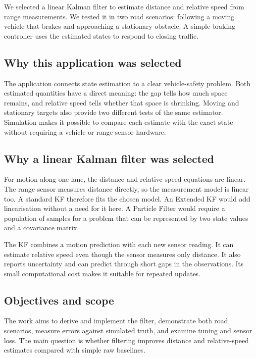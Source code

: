 \documentclass[11pt,a4paper]{article}
\begin{document}
We selected a linear Kalman filter to estimate distance and relative speed from range measurements. We tested it in two road scenarios: following a moving vehicle that brakes and approaching a stationary obstacle. A simple braking controller uses the estimated states to respond to closing traffic.\par

\subsection{Why this application was selected}
The application connects state estimation to a clear vehicle-safety problem. Both estimated quantities have a direct meaning: the gap tells how much space remains, and relative speed tells whether that space is shrinking. Moving and stationary targets also provide two different tests of the same estimator. Simulation makes it possible to compare each estimate with the exact state without requiring a vehicle or range-sensor hardware.\par

\subsection{Why a linear Kalman filter was selected}
For motion along one lane, the distance and relative-speed equations are linear. The range sensor measures distance directly, so the measurement model is linear too. A standard KF therefore fits the chosen model. An Extended KF would add linearisation without a need for it here. A Particle Filter would require a population of samples for a problem that can be represented by two state values and a covariance matrix.\par

The KF combines a motion prediction with each new sensor reading. It can estimate relative speed even though the sensor measures only distance. It also reports uncertainty and can predict through short gaps in the observations. Its small computational cost makes it suitable for repeated updates.\par

\subsection{Objectives and scope}
The work aims to derive and implement the filter, demonstrate both road scenarios, measure errors against simulated truth, and examine tuning and sensor loss. The main question is whether filtering improves distance and relative-speed estimates compared with simple raw baselines.\par
\end{document}
